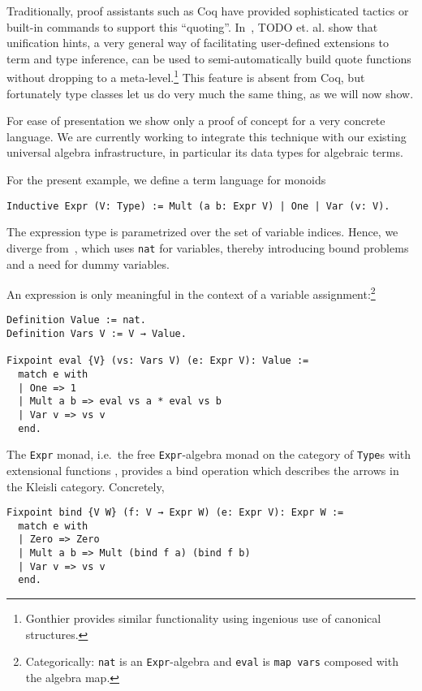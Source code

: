 \documentclass[a4paper,10pt,runningheads]{llncs}
\begin{document}
Traditionally, proof assistants such as Coq have provided sophisticated tactics or built-in commands to support this ``quoting''. In~\cite{Hints}, TODO et. al. show that unification hints, a very general way of facilitating user-defined extensions to term and type inference, can be used to semi-automatically build quote functions without dropping to a meta-level.\footnote{Gonthier provides similar functionality using ingenious use of canonical structures.} This feature is absent from Coq, but fortunately type classes let us do very much the same thing, as we will now show.

For ease of presentation we show only a proof of concept for a very concrete language. We are currently working to integrate this technique with our existing universal algebra infrastructure, in particular its data types for algebraic terms.%

For the present example, we define a term language for monoids
\begin{lstlisting}
Inductive Expr (V: Type) := Mult (a b: Expr V) | One | Var (v: V).
\end{lstlisting}

The expression type is parametrized over the set of variable indices. Hence, we diverge from~\cite{Hints}, which uses \lstinline|nat| for variables, thereby introducing bound problems and a need for dummy variables.

An expression is only meaningful in the context of a variable assignment:\footnote{Categorically: \lstinline|nat| is an \lstinline|Expr|-algebra and \lstinline|eval| is \lstinline|map vars| composed with the algebra map.}
\begin{lstlisting}
Definition Value := nat.
Definition Vars V := V → Value.

Fixpoint eval {V} (vs: Vars V) (e: Expr V): Value :=
  match e with
  | One => 1
  | Mult a b => eval vs a * eval vs b
  | Var v => vs v
  end.
\end{lstlisting}

The \lstinline|Expr| monad, i.e.\ the free \lstinline|Expr|-algebra monad on the category of \lstinline|Type|s with extensional functions%
, provides a bind operation which describes the arrows in the Kleisli category. Concretely,
\begin{lstlisting}
Fixpoint bind {V W} (f: V → Expr W) (e: Expr V): Expr W :=
  match e with
  | Zero => Zero
  | Mult a b => Mult (bind f a) (bind f b)
  | Var v => vs v
  end.
\end{lstlisting}
\end{document}

